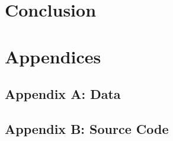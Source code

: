 \documentclass[a4paper]{article}
\begin{document}
\qq

\section{Conclusion}

\qq 

\qq 

\section{Appendices}

\subsection{Appendix A: Data}

\subsection{Appendix B: Source Code}
\end{document}
